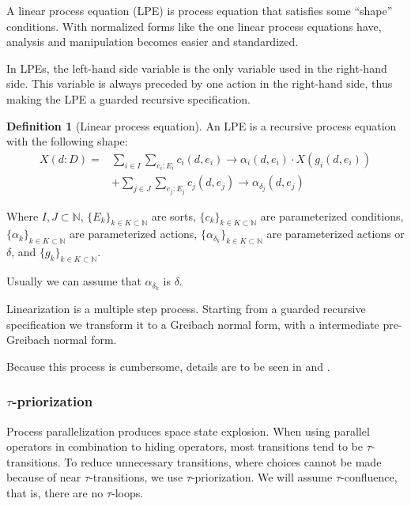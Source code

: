 \documentclass[11pt]{article}
\theoremstyle{definition}
\newtheorem{definition}{Definition}
\theoremstyle{plain}
\theoremstyle{definition}
\begin{document}
A linear process equation (LPE) is process equation that satisfies some ``shape'' conditions. With normalized forms like the one linear process equations have, analysis and manipulation becomes easier and standardized.

In LPEs, the left-hand side variable is the only variable used in the right-hand side. This variable is always preceded by one action in the right-hand side, thus making the LPE a guarded recursive specification.

\begin{definition} [Linear process equation]
	An LPE is a recursive process equation with the following shape:
	\begin{align}
			X(d:D) = &\sum_{i\in I}\sum_{e_i:E_i} c_i (d,e_i) \rightarrow\alpha_i (d,e_i)·X(g_i(d,e_i)) \\
			& + \sum_{j\in J}\sum_{e_j:E_j} c_j (d,e_j) \rightarrow\alpha_{\delta_j}(d,e_j)
	\end{align}
	
	Where $ I,J \subset \mathbb{N} $, $ \{E_k\}_{k\in K \subset \mathbb{N}} $ are sorts,  $ \{c_k\}_{k\in K \subset \mathbb{N}} $ are parameterized conditions, $ \{\alpha_k\}_{k\in K \subset \mathbb{N}} $ are parameterized actions, $ \{\alpha_{\delta_k}\}_{k\in K \subset \mathbb{N}} $ are parameterized actions or $ \delta $, and $ \{g_k\}_{k\in K \subset \mathbb{N}} $.
\end{definition}

Usually we can assume that $ \alpha_{\delta_k} $ is $ \delta $.

Linearization is a multiple step process. Starting from a guarded recursive specification we transform it to a Greibach normal form, with a intermediate pre-Greibach normal form.

Because this process is cumbersome, details are to be seen in \cite{Groote:2014:MAC:2628007} and \cite{Baeten:1993:DBE:174130.174141}.

\subsubsection{$ \tau $-priorization}
Process parallelization produces space state explosion. When using parallel operators in combination to hiding operators, most transitions tend to be $\tau$-transitions. To reduce unnecessary transitions, where choices cannot be made because of near $ \tau $-transitions, we use $ \tau $-priorization. We will assume $ \tau $-confluence, that is, there are no $ \tau $-loops.
\end{document}
